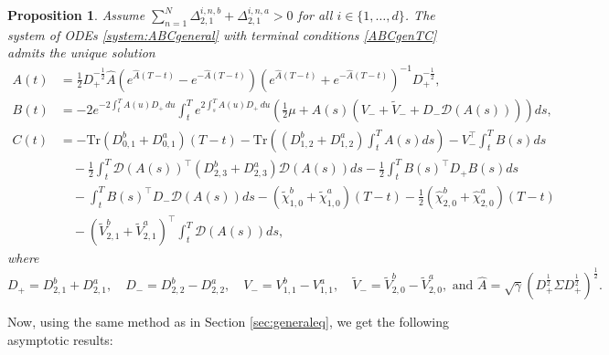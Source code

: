\documentclass[preprint, 3p]{elsarticle}
\newcommand{\1}{{\chi}}
\newtheorem{proposition}{Proposition}
\begin{document}
\begin{proposition}\label{prop:GENode_solution}
Assume $\sum_{n=1}^N \Delta^{i,n, b}_{2,1} + \Delta^{i,n, a}_{2,1} > 0$ for all $i \in \{ 1, \ldots, d
\}$. The system of ODEs
\eqref{system:ABCgeneral} with terminal conditions \eqref{ABCgenTC} admits the
unique solution
\begin{align*}
A(t) & = \frac{1}{2} D^{-\frac 12}_+ \widehat{A}
    \left( e^{ \widehat{A} (T - t)} - e^{-\widehat{A} (T - t)} \right)
    \left( e^{ \widehat{A} (T - t)} + e^{-\widehat{A} (T - t)} \right)^{-1} D_+^{-\frac 12}, \\
B(t) & = -2 e^{-2 \int_t^T A(u) D_+ \,du} \int_t^T
    e^{2 \int_s^T A(u) D_+ \,du}\left(\frac 12 \mu +  A(s) \left(V_- +  \tilde V_- + D_- \mathcal D(A(s)) \right) \right) ds, \\
C(t) & =  -\textrm{Tr}\left(D^b_{0,1} + D^a_{0,1}\right) (T - t)
       -  \textrm{Tr}\left(\left(D^b_{1,2} + D^a_{1,2}\right) \int_t^T A(s) ds \right)
       -  V_-^\intercal  \int_t^T B(s) ds \\
     & \quad  - \frac 12 \int_t^T \mathcal{D}(A(s))^\intercal \left(D^b_{2,3}
         + D^a_{2,3}\right) \mathcal{D}(A(s)) ds
       - \frac 12 \int_t^T B(s)^\intercal D_+ B(s) ds \\
     & \quad - \int_t^T B(s)^\intercal D_- \mathcal{D}(A(s)) ds - \left( \tilde{\chi}^{b}_{1,0} + \tilde{\chi}^{a}_{1,0} \right) (T-t) - \frac 12 \left(\hat{\chi}^{b}_{2,0} + \hat{\chi}^{a}_{2,0} \right)(T-t) \\
     & \quad - \left( {\tilde{V}^{b}_{2,1}} + {\tilde{V }^{a}_{2,1}} \right)^\intercal \int_t^T \mathcal D(A(s))ds,
\end{align*}
where
\[ D_+ = D^b_{2,1} + D^a_{2,1}, \quad
   D_- = D_{2,2}^b - D_{2,2}^a, \quad
   V_- = V_{1,1}^b - V_{1,1}^a, \quad \tilde V_- =  \tilde V^b_{2,0} - \tilde V^a_{2,0},\text{ and }
   \widehat{A}
   = \sqrt{\gamma} \left( D_+^{\frac 12} \Sigma D_+^{\frac 12} \right)^{\frac 12}.\]
\end{proposition}

Now, using the same method as in Section \ref{sec:generaleq}, we get the following asymptotic results:
\end{document}

